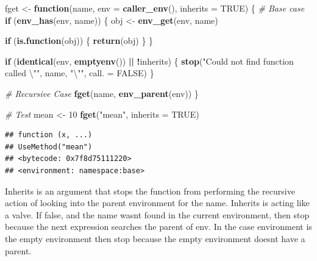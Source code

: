 \documentclass[]{book}
\newenvironment{Shaded}{\begin{snugshade}}{\end{snugshade}}
\newcommand{\CharTok}[1]{\textcolor[rgb]{0.31,0.60,0.02}{#1}}
\newcommand{\CommentTok}[1]{\textcolor[rgb]{0.56,0.35,0.01}{\textit{#1}}}
\newcommand{\ControlFlowTok}[1]{\textcolor[rgb]{0.13,0.29,0.53}{\textbf{#1}}}
\newcommand{\DataTypeTok}[1]{\textcolor[rgb]{0.13,0.29,0.53}{#1}}
\newcommand{\DecValTok}[1]{\textcolor[rgb]{0.00,0.00,0.81}{#1}}
\newcommand{\KeywordTok}[1]{\textcolor[rgb]{0.13,0.29,0.53}{\textbf{#1}}}
\newcommand{\NormalTok}[1]{#1}
\newcommand{\OperatorTok}[1]{\textcolor[rgb]{0.81,0.36,0.00}{\textbf{#1}}}
\newcommand{\OtherTok}[1]{\textcolor[rgb]{0.56,0.35,0.01}{#1}}
\newcommand{\StringTok}[1]{\textcolor[rgb]{0.31,0.60,0.02}{#1}}
\begin{document}
\begin{Shaded}
\begin{Highlighting}[]
\NormalTok{fget <-}\StringTok{ }\ControlFlowTok{function}\NormalTok{(name, }\DataTypeTok{env =} \KeywordTok{caller_env}\NormalTok{(), }\DataTypeTok{inherits =} \OtherTok{TRUE}\NormalTok{) \{}
  \CommentTok{# Base case}
  \ControlFlowTok{if}\NormalTok{ (}\KeywordTok{env_has}\NormalTok{(env, name)) \{}
\NormalTok{    obj <-}\StringTok{ }\KeywordTok{env_get}\NormalTok{(env, name)}

    \ControlFlowTok{if}\NormalTok{ (}\KeywordTok{is.function}\NormalTok{(obj)) \{}
      \KeywordTok{return}\NormalTok{(obj)}
\NormalTok{    \}}
\NormalTok{  \}}

  \ControlFlowTok{if}\NormalTok{ (}\KeywordTok{identical}\NormalTok{(env, }\KeywordTok{emptyenv}\NormalTok{()) }\OperatorTok{||}\StringTok{ }\OperatorTok{!}\NormalTok{inherits) \{}
    \KeywordTok{stop}\NormalTok{(}\StringTok{"Could not find function called }\CharTok{\textbackslash{}"}\StringTok{"}\NormalTok{, name, }\StringTok{"}\CharTok{\textbackslash{}"}\StringTok{"}\NormalTok{, }\DataTypeTok{call. =} \OtherTok{FALSE}\NormalTok{)}
\NormalTok{  \}}

  \CommentTok{# Recursive Case}
  \KeywordTok{fget}\NormalTok{(name, }\KeywordTok{env_parent}\NormalTok{(env))}
\NormalTok{\}}
\end{Highlighting}
\end{Shaded}

\begin{Shaded}
\begin{Highlighting}[]
\CommentTok{# Test}
\NormalTok{mean <-}\StringTok{ }\DecValTok{10}
\KeywordTok{fget}\NormalTok{(}\StringTok{"mean"}\NormalTok{, }\DataTypeTok{inherits =} \OtherTok{TRUE}\NormalTok{)}
\end{Highlighting}
\end{Shaded}

\begin{verbatim}
## function (x, ...) 
## UseMethod("mean")
## <bytecode: 0x7f8d75111220>
## <environment: namespace:base>
\end{verbatim}

Inherits is an argument that stops the function from performing the recursive action of looking into the parent environment for the name. Inherits is acting like a valve. If false, and the name wasnt found in the current environment, then stop because the next expression searches the parent of env. In the case environment is the empty environment then stop because the empty environment doesnt have a parent.
\end{document}
